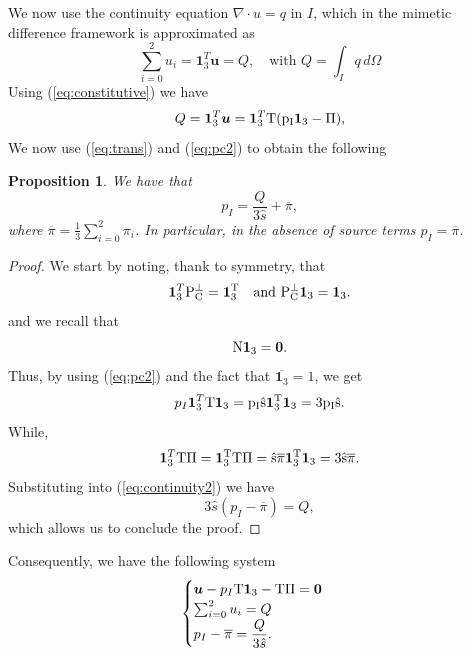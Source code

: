 \documentclass[11pt,a4paper,twoside]{article}
\newcommand{\flux}{\ensuremath{u}}
\newcommand{\pressure}{\ensuremath{p}}
\newcommand{\edgepressure}{\ensuremath{\pi}}
\newcommand{\N}{\ensuremath{\rm N}}
\newcommand{\PC}{\ensuremath{\rm P}_C^{\perp}}
\newcommand{\trans}{\ensuremath{\rm T}}
\newcommand{\fluxvector}{\ensuremath{\boldsymbol{u}}}
\newcommand{\intsource}{\ensuremath{Q}}
\newtheorem{prop}{Proposition}
\begin{document}
We now use the continuity equation $\nabla\cdot u=q$ in $I$, which in the mimetic difference framework is approximated as
\begin{equation}
\label{eq:continuity}
\sum_{i=0}^2 \flux_i=\boldsymbol{1}_3^T\fluxvector=\intsource, \quad \text{with } \intsource=\int_Iq\, d\Omega
\end{equation}
Using (\ref{eq:constitutive}) we have
\begin{equation}
\label{eq:continuity2}
\intsource=\boldsymbol{1}_3^T\fluxvector=\boldsymbol{1}_3^T\trans(\pressure_I\boldsymbol{1}_3-\Pi),
\end{equation}
We now use (\ref{eq:trans}) and (\ref{eq:pc2}) to obtain the following
\begin{prop}
We have that 
\begin{equation}
\label{eq:pressure}
\pressure_I=\dfrac{\intsource}{3\hat{s}}+\overline{\edgepressure},
\end{equation}
where $\overline{\edgepressure}=\frac{1}{3}\sum_{i=0}^2\edgepressure_i$.
In particular, in the absence of source terms $\pressure_I=\overline{\edgepressure}$.
\end{prop}
\begin{proof}
We start by noting, thank to symmetry, that
\[
\boldsymbol{1}_3^T\PC=\boldsymbol{1}_3^T\quad \text{and } \PC\boldsymbol{1}_3=\boldsymbol{1}_3.
\]
and we recall that
\[
\N\boldsymbol{1}_3=\boldsymbol{0}.
\]
Thus, by using (\ref{eq:pc2}) and the fact that $\overline{\boldsymbol{1}_3}=1$, we get
\[
\pressure_I\boldsymbol{1}_3^{T}\trans\boldsymbol{1}_3=\pressure_I\hat{s}\boldsymbol{1}_3^{T}\boldsymbol{1}_3=3\pressure_I\hat{s}.
\]
While,
\[
\boldsymbol{1}_3^{T}\trans\Pi=\boldsymbol{1}_3^{T}\trans\Pi=
\hat{s}\overline{\edgepressure}\boldsymbol{1}_3^{T}\boldsymbol{1}_3=3\hat{s}\overline{\edgepressure}.
\]
Substituting into (\ref{eq:continuity2}) we have
\[
3\hat{s}(\pressure_I-\overline{\edgepressure})=\intsource,
\]
which allows us to conclude the proof.
\end{proof}
Consequently, we have the following system
\begin{equation}
\label{eq:finalsystem}
\begin{cases}
\fluxvector-\pressure_I\trans\boldsymbol{1}_3-\trans\Pi=\boldsymbol{0}\\
\sum_{i=0}^2 \flux_i=\intsource \\
\pressure_I-\overline{\edgepressure}=\dfrac{\intsource}{3\hat{s}}.
\end{cases}
\end{equation}
\end{document}
